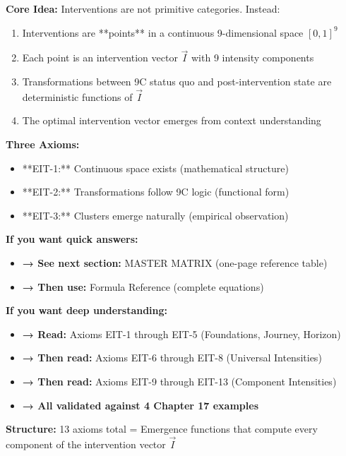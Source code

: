 \begin{tcolorbox}[colback=blue!5!white, colframe=blue!75!black,
    title=\textbf{Part 1 Overview: The Continuous Intervention Space}]

\textbf{Core Idea:} Interventions are not primitive categories. Instead:
\begin{enumerate}[nosep]
\item Interventions are **points** in a continuous 9-dimensional space $[0,1]^9$
\item Each point is an intervention vector $\vec{I}$ with 9 intensity components
\item Transformations between 9C status quo and post-intervention state are deterministic functions of $\vec{I}$
\item The optimal intervention vector emerges from context understanding
\end{enumerate}

\textbf{Three Axioms:}
\begin{itemize}[nosep]
\item **EIT-1:** Continuous space exists (mathematical structure)
\item **EIT-2:** Transformations follow 9C logic (functional form)
\item **EIT-3:** Clusters emerge naturally (empirical observation)
\end{itemize}

\end{tcolorbox}

\begin{tcolorbox}[colback=green!5!white, colframe=green!75!black,
    title=\textbf{✓ How This Appendix Is Structured (and Where to Start)}]

\textbf{If you want quick answers:}
\begin{itemize}[nosep]
\item \textbf{→ See next section:} MASTER MATRIX (one-page reference table)
\item \textbf{→ Then use:} Formula Reference (complete equations)
\end{itemize}

\textbf{If you want deep understanding:}
\begin{itemize}[nosep]
\item \textbf{→ Read:} Axioms EIT-1 through EIT-5 (Foundations, Journey, Horizon)
\item \textbf{→ Then read:} Axioms EIT-6 through EIT-8 (Universal Intensities)
\item \textbf{→ Then read:} Axioms EIT-9 through EIT-13 (Component Intensities)
\item \textbf{→ All validated against 4 Chapter 17 examples}
\end{itemize}

\textbf{Structure:} 13 axioms total = Emergence functions that compute every component of the intervention vector $\vec{I}$

\end{tcolorbox}


